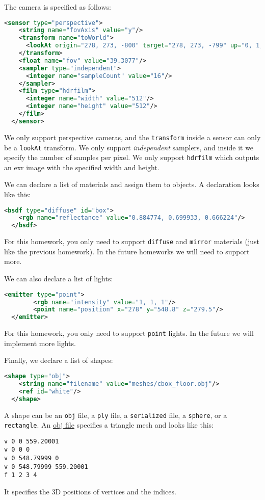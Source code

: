 The camera is specified as follows:
\begin{lstlisting}[language=xml]
  <sensor type="perspective">
    <string name="fovAxis" value="y"/>
    <transform name="toWorld">
      <lookAt origin="278, 273, -800" target="278, 273, -799" up="0, 1, 0"/>
    </transform>
    <float name="fov" value="39.3077"/>
    <sampler type="independent">
      <integer name="sampleCount" value="16"/>
    </sampler>
    <film type="hdrfilm">
      <integer name="width" value="512"/>
      <integer name="height" value="512"/>
    </film>
  </sensor>
\end{lstlisting}
We only support perspective cameras, and the \lstinline{transform} inside a sensor can only be a \lstinline{lookAt} transform. We only support \emph{independent} samplers, and inside it we specify the number of samples per pixel. We only support \lstinline{hdrfilm} which outputs an exr image with the specified width and height.

We can declare a list of materials and assign them to objects. A declaration looks like this:
\begin{lstlisting}[language=xml]
  <bsdf type="diffuse" id="box">
    <rgb name="reflectance" value="0.884774, 0.699933, 0.666224"/>
  </bsdf>
\end{lstlisting}
For this homework, you only need to support \lstinline{diffuse} and \lstinline{mirror} materials (just like the previous homework). In the future homeworks we will need to support more.

We can also declare a list of lights:
\begin{lstlisting}[language=xml]
  <emitter type="point">
        <rgb name="intensity" value="1, 1, 1"/>
        <point name="position" x="278" y="548.8" z="279.5"/>
  </emitter>
\end{lstlisting}
For this homework, you only need to support \lstinline{point} lights. In the future we will implement more lights.

Finally, we declare a list of shapes:
\begin{lstlisting}[language=xml]
  <shape type="obj">
    <string name="filename" value="meshes/cbox_floor.obj"/>
    <ref id="white"/>
  </shape>
\end{lstlisting}
A shape can be an \lstinline{obj} file, a \lstinline{ply} file, a \lstinline{serialized} file, a \lstinline{sphere}, or a \lstinline{rectangle}. An \href{https://en.wikipedia.org/wiki/Wavefront_.obj_file}{obj file} specifies a triangle mesh and looks like this:
\begin{lstlisting}
v 0 0 559.20001
v 0 0 0
v 0 548.79999 0
v 0 548.79999 559.20001
f 1 2 3 4
\end{lstlisting}
It specifies the 3D positions of vertices and the indices.

